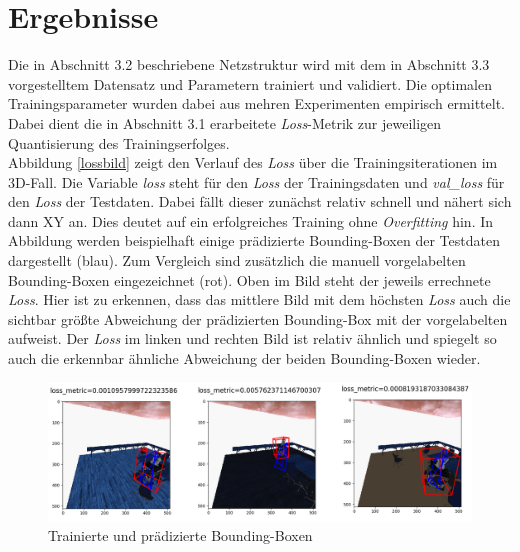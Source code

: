 \section{Ergebnisse}
Die in Abschnitt 3.2 beschriebene Netzstruktur wird mit dem in Abschnitt 3.3 vorgestelltem Datensatz und Parametern trainiert und validiert. Die optimalen Trainingsparameter wurden dabei aus mehren Experimenten empirisch ermittelt. Dabei dient die in Abschnitt 3.1 erarbeitete \textit{Loss}-Metrik zur jeweiligen Quantisierung des Trainingserfolges. \\Abbildung \ref{lossbild} zeigt den Verlauf des \textit{Loss} über die Trainingsiterationen im 3D-Fall. Die Variable \textit{loss} steht für den \textit{Loss}  der Trainingsdaten und \textit{val\_loss} für den \textit{Loss} der Testdaten. Dabei fällt dieser zunächst relativ schnell und nähert sich dann XY an. Dies deutet auf ein erfolgreiches Training ohne \textit{Overfitting} hin. 
In Abbildung werden beispielhaft einige prädizierte Bounding-Boxen der Testdaten dargestellt (blau). Zum Vergleich sind zusätzlich die manuell vorgelabelten Bounding-Boxen eingezeichnet (rot). Oben im Bild steht der jeweils errechnete \textit{Loss}. Hier ist zu erkennen, dass das mittlere Bild mit dem höchsten \textit{Loss} auch die sichtbar größte Abweichung der prädizierten Bounding-Box mit der vorgelabelten aufweist. Der \textit{Loss} im linken und rechten Bild ist relativ ähnlich und spiegelt so auch die erkennbar ähnliche Abweichung der beiden Bounding-Boxen wieder.\\ \label{pred_boxes}
\begin{figure}[!htb]
  \centering
  \includegraphics[width=13.8cm]{Abb/pred_bb.png}
  \caption{Trainierte und prädizierte Bounding-Boxen}
  \label{pred_boxes}
\end{figure} 
